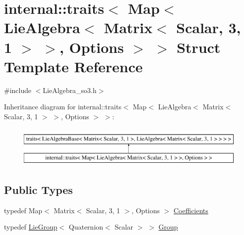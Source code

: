 \hypertarget{structinternal_1_1traits_3_01_map_3_01_lie_algebra_3_01_matrix_3_01_scalar_00_013_00_011_01_4_01_4_00_01_options_01_4_01_4}{}\section{internal\+:\+:traits$<$ Map$<$ Lie\+Algebra$<$ Matrix$<$ Scalar, 3, 1 $>$ $>$, Options $>$ $>$ Struct Template Reference}
\label{structinternal_1_1traits_3_01_map_3_01_lie_algebra_3_01_matrix_3_01_scalar_00_013_00_011_01_4_01_4_00_01_options_01_4_01_4}


{\ttfamily \#include $<$Lie\+Algebra\+\_\+so3.\+h$>$}

Inheritance diagram for internal\+:\+:traits$<$ Map$<$ Lie\+Algebra$<$ Matrix$<$ Scalar, 3, 1 $>$ $>$, Options $>$ $>$\+:\begin{figure}[H]
\begin{center}
\leavevmode
\includegraphics[height=2.000000cm]{structinternal_1_1traits_3_01_map_3_01_lie_algebra_3_01_matrix_3_01_scalar_00_013_00_011_01_4_01_4_00_01_options_01_4_01_4}
\end{center}
\end{figure}
\subsection*{Public Types}
\begin{DoxyCompactItemize}
\item 
typedef Map$<$ Matrix$<$ Scalar, 3, 1 $>$, Options $>$ \hyperlink{structinternal_1_1traits_3_01_map_3_01_lie_algebra_3_01_matrix_3_01_scalar_00_013_00_011_01_4_01_4_00_01_options_01_4_01_4_a24755baa54832046371ad39bee3aa3f5}{Coefficients}
\item 
typedef \hyperlink{class_lie_group}{Lie\+Group}$<$ Quaternion$<$ Scalar $>$ $>$ \hyperlink{structinternal_1_1traits_3_01_map_3_01_lie_algebra_3_01_matrix_3_01_scalar_00_013_00_011_01_4_01_4_00_01_options_01_4_01_4_a3ade09718f291d48f6471acab1dc0a38}{Group}
\end{DoxyCompactItemize}


